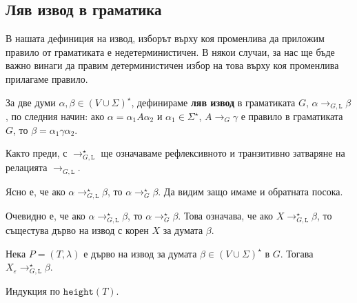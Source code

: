 \subsection*{Ляв извод в граматика}

В нашата дефиниция на извод, изборът върху коя променлива да приложим правило от граматиката е недетерминистичен.
В някои случаи, за нас ще бъде важно винаги да правим детерминистичен избор на това върху коя променлива прилагаме правило.

За две думи $\alpha,\beta \in (V\cup\Sigma)^\star$, дефинираме {\bf ляв извод} в граматиката $G$, $\alpha \to_{G,\texttt{L}} \beta$,  по следния начин:
ако $\alpha = \alpha_1A\alpha_2$ и $\alpha_1 \in \Sigma^\star$, $A \to_G \gamma$ е правило в граматиката $G$, то
$\beta = \alpha_1\gamma \alpha_2$.

Както преди, с $\to^\star_{G,\texttt{L}}$ ще означаваме рефлексивното и транзитивно затваряне на релацията $\to_{G,\texttt{L}}$.

Ясно е, че ако $\alpha \to^\star_{G,\texttt{L}} \beta$, то $\alpha \to^\star_G \beta$.
Да видим защо имаме и обратната посока.

Очевидно е, че ако $\alpha \to^\star_{G,\texttt{L}} \beta$, то $\alpha \to^\star_G \beta$.
Това означава, че ако $X \to^\star_{G,\texttt{L}} \beta$, то същестува дърво на извод с корен $X$ за думата $\beta$.

\begin{lemma}
  Нека $P = (T,\lambda)$ е дърво на извод за думата $\beta \in (V\cup\Sigma)^\star$ в $G$.
  Тогава $X_\varepsilon \to^\star_{G,\texttt{L}} \beta$.
\end{lemma}  
\begin{hint}
  Индукция по $\texttt{height}(T)$.
\end{hint}



